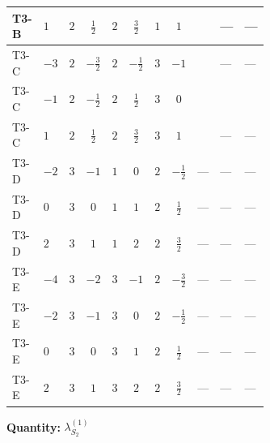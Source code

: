 \documentclass[8pt]{article}
\begin{document}
\begin{landscape}
\begin{longtable}{@{}llcccccc >{\raggedright\arraybackslash}p{0.21\linewidth} >{\raggedright\arraybackslash}p{0.21\linewidth} >{\raggedright\arraybackslash}p{0.21\linewidth}@{}}
\midrule
T3-B & $1$ & $2$ & $\frac{1}{2}$ & $2$ & $\frac{3}{2}$ & $1$ & $1$ & \scriptsize\adjustbox{max width=\linewidth}{$\begin{gathered} +\frac{{\lambda_{HS_2}^{(A)}}^2}{4}\end{gathered}$} & --- & --- \\
\midrule
T3-C & $-3$ & $2$ & $-\frac{3}{2}$ & $2$ & $-\frac{1}{2}$ & $3$ & $-1$ & \scriptsize\adjustbox{max width=\linewidth}{$\begin{gathered} +\frac{{\lambda_{HS_2}^{(A)}}^2}{4}\end{gathered}$} & --- & --- \\
\midrule
T3-C & $-1$ & $2$ & $-\frac{1}{2}$ & $2$ & $\frac{1}{2}$ & $3$ & $0$ & \scriptsize\adjustbox{max width=\linewidth}{$\begin{gathered} +\frac{{\lambda_{HS_2}^{(A)}}^2}{4}\end{gathered}$} & \scriptsize\adjustbox{max width=\linewidth}{$\begin{gathered} +8 {\lambda_{8}} \left({\lambda_{8}}\right)^{*}\end{gathered}$} & \scriptsize\adjustbox{max width=\linewidth}{$\begin{gathered} +8 {\lambda_{9}} \left({\lambda_{9}}\right)^{*}\end{gathered}$} \\
\midrule
T3-C & $1$ & $2$ & $\frac{1}{2}$ & $2$ & $\frac{3}{2}$ & $3$ & $1$ & \scriptsize\adjustbox{max width=\linewidth}{$\begin{gathered} +\frac{{\lambda_{HS_2}^{(A)}}^2}{4}\end{gathered}$} & --- & --- \\
\midrule
T3-D & $-2$ & $3$ & $-1$ & $1$ & $0$ & $2$ & $-\frac{1}{2}$ & --- & --- & --- \\
\midrule
T3-D & $0$ & $3$ & $0$ & $1$ & $1$ & $2$ & $\frac{1}{2}$ & --- & --- & --- \\
\midrule
T3-D & $2$ & $3$ & $1$ & $1$ & $2$ & $2$ & $\frac{3}{2}$ & --- & --- & --- \\
\midrule
T3-E & $-4$ & $3$ & $-2$ & $3$ & $-1$ & $2$ & $-\frac{3}{2}$ & --- & --- & --- \\
\midrule
T3-E & $-2$ & $3$ & $-1$ & $3$ & $0$ & $2$ & $-\frac{1}{2}$ & --- & --- & --- \\
\midrule
T3-E & $0$ & $3$ & $0$ & $3$ & $1$ & $2$ & $\frac{1}{2}$ & --- & --- & --- \\
\midrule
T3-E & $2$ & $3$ & $1$ & $3$ & $2$ & $2$ & $\frac{3}{2}$ & --- & --- & --- \\
\midrule
\bottomrule
\end{longtable}
\clearpage
\noindent\textbf{Quantity: }$\lambda_{S_2}^{(1)}$\par\smallskip

\end{landscape}
\end{document}
